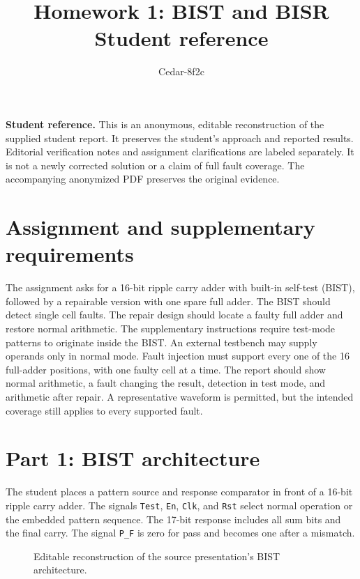 \documentclass[11pt,a4paper]{article}
\title{Homework 1: BIST and BISR\\Student reference}
\author{Cedar-8f2c}
\date{}
\newcommand{\bits}[1]{\texttt{#1}}
\newcommand{\reference}{\noindent\textbf{Student reference.} This is an anonymous, editable reconstruction of the supplied student report. It preserves the student's approach and reported results. Editorial verification notes and assignment clarifications are labeled separately. It is not a newly corrected solution or a claim of full fault coverage. The accompanying anonymized PDF preserves the original evidence.\par}
\begin{document}
\maketitle
\reference

\section{Assignment and supplementary requirements}
The assignment asks for a 16-bit ripple carry adder with built-in self-test (BIST), followed by a repairable version with one spare full adder. The BIST should detect single cell faults. The repair design should locate a faulty full adder and restore normal arithmetic.
The supplementary instructions require test-mode patterns to originate inside the BIST. An external testbench may supply operands only in normal mode. Fault injection must support every one of the 16 full-adder positions, with one faulty cell at a time. The report should show normal arithmetic, a fault changing the result, detection in test mode, and arithmetic after repair. A representative waveform is permitted, but the intended coverage still applies to every supported fault.

\section{Part 1: BIST architecture}
The student places a pattern source and response comparator in front of a 16-bit ripple carry adder. The signals \bits{Test}, \bits{En}, \bits{Clk}, and \bits{Rst} select normal operation or the embedded pattern sequence. The 17-bit response includes all sum bits and the final carry. The signal \bits{P\_F} is zero for pass and becomes one after a mismatch.
\begin{figure}[ht]\centering
{}
\caption{Editable reconstruction of the source presentation's BIST architecture.}
\end{figure}
\end{document}
